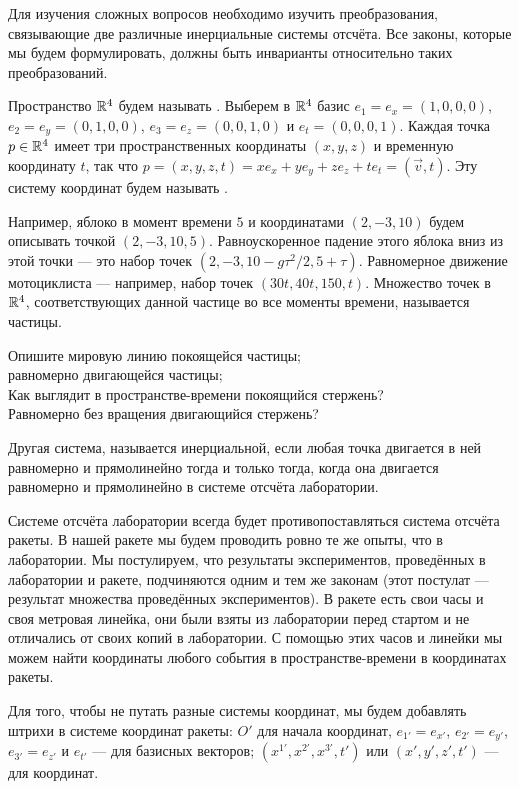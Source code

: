 \documentclass[a4paper,12pt]{article}
\begin{document}

{\small
Для изучения сложных вопросов необходимо изучить преобразования, связывающие две различные инерциальные системы отсчёта.
Все законы, которые мы будем формулировать, должны быть инварианты относительно таких преобразований.

Пространство $\mathbb{R}^4$ будем называть .
Выберем в $\mathbb{R}^4$ базис $e_1 = e_x = (1,0,0,0)$, $e_2 = e_y = (0,1,0,0)$, $e_3 = e_z = (0,0,1,0)$ и $e_t=(0,0,0,1)$.
Каждая точка $p\in\mathbb{R}^4$ имеет три пространственных координаты $(x,y,z)$ и временную координату $t$, так что $p = (x,y,z,t)= x e_x + y e_y + z e_z + t e_t = (\vec{v},t)$. Эту систему координат будем называть .

Например, яблоко в момент времени $5$ и координатами $(2,-3,10)$ будем описывать точкой $(2,-3,10,5)$. Равноускоренное падение этого яблока вниз из этой точки --- это набор точек $(2,-3,10-g\tau^2/2,5+\tau)$. Равномерное движение мотоциклиста --- например, набор точек $(30t,40t,150,t)$. Множество точек в $\mathbb{R}^4$, соответствующих данной частице во все моменты времени, называется  частицы.

}

    Опишите мировую линию
     покоящейся частицы;\\
     равномерно двигающейся частицы;\\
     Как выглядит в пространстве-времени покоящийся стержень?\\
     Равномерно без вращения двигающийся стержень?


{\small
Другая система, называется  инерциальной, если любая точка двигается в ней равномерно и прямолинейно тогда и только тогда, когда она двигается равномерно и прямолинейно в системе отсчёта лаборатории.

Системе отсчёта лаборатории всегда будет противопоставляться система отсчёта  ракеты.
В нашей ракете мы будем проводить ровно те же опыты, что в лаборатории.
Мы постулируем, что результаты экспериментов, проведённых в лаборатории и ракете, подчиняются одним и тем же законам
(этот постулат --- результат множества проведённых экспериментов).
В ракете есть свои часы и своя метровая линейка,
они были взяты из лаборатории перед стартом и не отличались от своих копий в лаборатории.
С помощью этих часов и линейки мы можем найти координаты любого события в пространстве-времени в координатах ракеты.


Для того, чтобы не путать разные системы координат, мы будем добавлять штрихи в системе координат  ракеты: $O'$ для начала координат, $e_{1'}=e_{x'}$, $e_{2'}=e_{y'}$, $e_{3'}=e_{z'}$ и $e_{t'}$ --- для базисных векторов; $(x^{1'},x^{2'},x^{3'},t')$ или  $(x',y',z',t')$ --- для координат.


}
\end{document}
